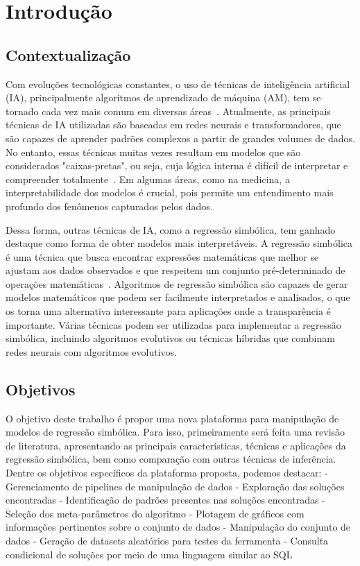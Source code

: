 \chapter{Introdução}
\section{Contextualização}

Com evoluções tecnológicas constantes, o uso de técnicas de inteligência artificial (IA), principalmente algoritmos de aprendizado de máquina (AM), tem se tornado cada vez mais comum em diversas áreas~\cite{Makke2024}. Atualmente, as principais técnicas de IA utilizadas são baseadas em redes neurais e transformadores, que são capazes de aprender padrões complexos a partir de grandes volumes de dados. No entanto, essas técnicas muitas vezes resultam em modelos que são considerados "caixas-pretas", ou seja, cuja lógica interna é difícil de interpretar e compreender totalmente~\cite{eggp}. Em algumas áreas, como na medicina, a interpretabilidade dos modelos é crucial, pois permite um entendimento mais profundo dos fenômenos capturados pelos dados.

Dessa forma, outras técnicas de IA, como a regressão simbólica, tem ganhado destaque como forma de obter modelos mais interpretáveis. A regressão simbólica é uma técnica que busca encontrar expressões matemáticas que melhor se ajustam aos dados observados e que respeitem um conjunto pré-determinado de operações matemáticas~\cite{eggp,rEGGression,Bartlett_2024}. Algoritmos de regressão simbólica são capazes de gerar modelos matemáticos que podem ser facilmente interpretados e analisados, o que os torna uma alternativa interessante para aplicações onde a transparência é importante. Várias técnicas podem ser utilizadas para implementar a regressão simbólica, incluindo algoritmos evolutivos ou técnicas híbridas que combinam redes neurais com algoritmos evolutivos.

\section{Objetivos}
O objetivo deste trabalho é propor uma nova plataforma para manipulação de modelos de regressão simbólica. Para isso, primeiramente será feita uma revisão de literatura, apresentando as principais características, técnicas e aplicações da regressão simbólica, bem como comparação com outras técnicas de inferência. Dentre os objetivos específicos da plataforma proposta, podemos destacar:
- Gerenciamento de pipelines de manipulação de dados
- Exploração das soluções encontradas
- Identificação de padrões presentes nas soluções encontradas
- Seleção dos meta-parâmetros do algoritmo
- Plotagem de gráficos com informações pertinentes sobre o conjunto de dados
- Manipulação do conjunto de dados
- Geração de datasets aleatórios para testes da ferramenta
- Consulta condicional de soluções por meio de uma linguagem similar ao SQL

